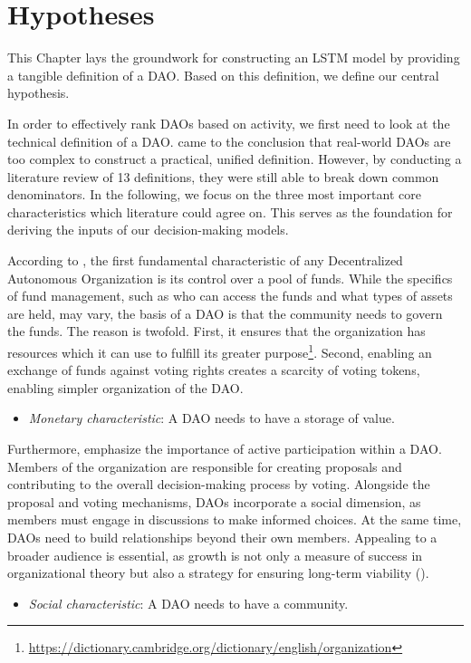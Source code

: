 \chapter{Hypotheses}
This Chapter lays the groundwork for constructing an LSTM model by providing a tangible definition of a DAO. Based on this definition, we define our central hypothesis.

In order to effectively rank DAOs based on activity, we first need to look at the technical definition of a DAO. 
\textcite{rikken2023ins} came to the conclusion that real-world DAOs are too complex to construct a practical, unified definition. However, by conducting a literature review of 13 definitions, they were still able to break down common denominators. In the following, we focus on the three most important core characteristics which literature could agree on. This serves as the foundation for deriving the inputs of our decision-making models.

According to \textcite{buterin2013ethereum}, the first fundamental characteristic of any Decentralized Autonomous Organization is its control over a pool of funds. 
While the specifics of fund management, such as who can access the funds and what types of assets are held, may vary, the basis of a DAO is that the community needs to govern the funds. 
The reason is twofold. First, it ensures that the organization has resources which it can use to fulfill its greater purpose\footnote{\href{https://dictionary.cambridge.org/dictionary/english/organization}{https://dictionary.cambridge.org/dictionary/english/organization}}. Second, enabling an exchange of funds against voting rights creates a scarcity of voting tokens, enabling simpler organization of the DAO.
\begin{itemize}
    \item \textit{Monetary characteristic}: A DAO needs to have a storage of value.
\end{itemize}

\noindent Furthermore, \textcite{hassan2021decentralized} emphasize the importance of active participation within a DAO. 
Members of the organization are responsible for creating proposals and contributing to the overall decision-making process by voting. 
Alongside the proposal and voting mechanisms, DAOs incorporate a social dimension, as members must engage in discussions to make informed choices. 
At the same time, DAOs need to build relationships beyond their own members. 
Appealing to a broader audience is essential, as growth is not only a measure of success in organizational theory but also a strategy for ensuring long-term viability (\cite{butlerorganizational}).
\begin{itemize}
    \item \textit{Social characteristic}: A DAO needs to have a community.
\end{itemize}

